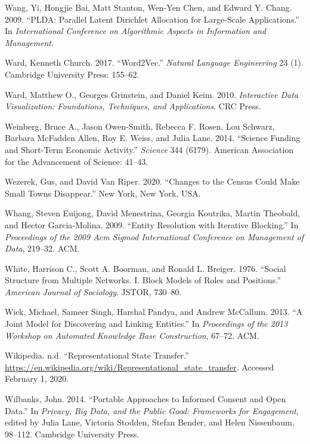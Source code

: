 \documentclass[]{krantz}
\begin{document}
\hypertarget{ref-wang-09}{}
Wang, Yi, Hongjie Bai, Matt Stanton, Wen-Yen Chen, and Edward Y. Chang.
2009. ``PLDA: Parallel Latent Dirichlet Allocation for Large-Scale
Applications.'' In \emph{International Conference on Algorithmic Aspects
in Information and Management}.

\hypertarget{ref-church-17}{}
Ward, Kenneth Church. 2017. ``Word2Vec.'' \emph{Natural Language
Engineering} 23 (1). Cambridge University Press: 155--62.

\hypertarget{ref-ward2010interactive}{}
Ward, Matthew O., Georges Grinstein, and Daniel Keim. 2010.
\emph{Interactive Data Visualization: Foundations, Techniques, and
Applications}. CRC Press.

\hypertarget{ref-weinberg2014science}{}
Weinberg, Bruce A., Jason Owen-Smith, Rebecca F. Rosen, Lou Schwarz,
Barbara McFadden Allen, Roy E. Weiss, and Julia Lane. 2014. ``Science
Funding and Short-Term Economic Activity.'' \emph{Science} 344 (6179).
American Association for the Advancement of Science: 41--43.

\hypertarget{ref-Wezerek}{}
Wezerek, Gus, and David Van Riper. 2020. ``Changes to the Census Could
Make Small Towns Disappear.'' New York, New York, USA.

\hypertarget{ref-whang2009entity}{}
Whang, Steven Euijong, David Menestrina, Georgia Koutrika, Martin
Theobald, and Hector Garcia-Molina. 2009. ``Entity Resolution with
Iterative Blocking.'' In \emph{Proceedings of the 2009 Acm Sigmod
International Conference on Management of Data}, 219--32. ACM.

\hypertarget{ref-white1976social}{}
White, Harrison C., Scott A. Boorman, and Ronald L. Breiger. 1976.
``Social Structure from Multiple Networks. I. Block Models of Roles and
Positions.'' \emph{American Journal of Sociology}. JSTOR, 730--80.

\hypertarget{ref-wick2013joint}{}
Wick, Michael, Sameer Singh, Harshal Pandya, and Andrew McCallum. 2013.
``A Joint Model for Discovering and Linking Entities.'' In
\emph{Proceedings of the 2013 Workshop on Automated Knowledge Base
Construction}, 67--72. ACM.

\hypertarget{ref-RESTwiki}{}
Wikipedia. n.d. ``Representational State Transfer.''
\url{https://en.wikipedia.org/wiki/Representational_state_transfer}.
Accessed February 1, 2020.

\hypertarget{ref-Wilbanks2014}{}
Wilbanks, John. 2014. ``Portable Approaches to Informed Consent and Open
Data.'' In \emph{Privacy, Big Data, and the Public Good: Frameworks for
Engagement}, edited by Julia Lane, Victoria Stodden, Stefan Bender, and
Helen Nissenbaum, 98--112. Cambridge University Press.
\end{document}
